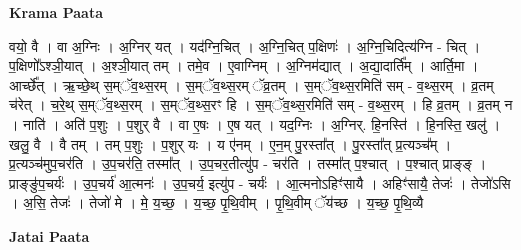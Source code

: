 \documentclass[17pt]{extarticle}
\begin{document}
\textbf{Krama Paata} \newline

वयो॒ वै । वा अ॒ग्निः । अ॒ग्निर् यत् । यद॑ग्नि॒चित् । अ॒ग्नि॒चित् प॒क्षिणः॑ । अ॒ग्नि॒चिदित्य॑ग्नि - चित् । प॒क्षिणो᳚ऽश्ञी॒यात् । अ॒श्ञी॒यात् तम् । तमे॒व । ए॒वाग्निम् । अ॒ग्निम॑द्यात् । अ॒द्या॒दार्ति᳚म् । आर्ति॒मा । आर्च्छे᳚त् । ऋ॒च्छे॒थ् स॒म्ॅव॒थ्स॒रम् । स॒म्ॅव॒थ्स॒रम् ॅव्र॒तम् । स॒म्ॅव॒थ्स॒रमिति॑ सम् - व॒थ्स॒रम् । व्र॒तम् च॑रेत् । च॒रे॒थ् स॒म्ॅव॒थ्स॒रम् । स॒म्ॅव॒थ्स॒रꣳ हि । स॒म्ॅव॒थ्स॒रमिति॑ सम् - व॒थ्स॒रम् । हि व्र॒तम् । व्र॒तम् न । नाति॑ । अति॑ प॒शुः । प॒शुर् वै । वा ए॒षः । ए॒ष यत् । यद॒ग्निः । अ॒ग्निर्. हि॒नस्ति॑ । हि॒नस्ति॒ खलु॑ । खलु॒ वै । वै तम् । तम् प॒शुः । प॒शुर् यः । य ए॑नम् । ए॒न॒म् पु॒रस्ता᳚त् । पु॒रस्ता᳚त् प्र॒त्यञ्च᳚म् । प्र॒त्यञ्च॑मुप॒चर॑ति । उ॒प॒चर॑ति॒ तस्मा᳚त् । उ॒प॒चर॒तीत्यु॑प - चर॑ति । तस्मा᳚त् प॒श्चात् । प॒श्चात् प्राङ्ङ् । प्राङ्ङु॑प॒चर्यः॑ । उ॒प॒चर्य॑ आ॒त्मनः॑ । उ॒प॒चर्य॒ इत्यु॑प - चर्यः॑ । आ॒त्मनोऽहिꣳ॑सायै । अहिꣳ॑सायै॒ तेजः॑ । तेजो॑ऽसि । अ॒सि॒ तेजः॑ । तेजो॑ मे । मे॒ य॒च्छ॒ । य॒च्छ॒ पृ॒थि॒वीम् । पृ॒थि॒वीम् ॅय॑च्छ । य॒च्छ॒ पृ॒थि॒व्यै \newline

\textbf{Jatai Paata} \newline
\end{document}
